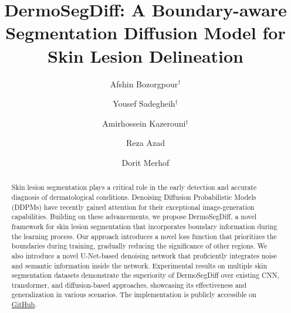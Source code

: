 \documentclass[runningheads]{llncs}
\begin{document}
\title{DermoSegDiff: A Boundary-aware Segmentation Diffusion Model for Skin Lesion Delineation}


\author{Afshin Bozorgpour$^\dag$ \and
Yousef Sadegheih$^\dag$ \and
Amirhossein Kazerouni$^\dag$ \and
Reza Azad  \and
Dorit Merhof }



\maketitle              \begin{abstract}

Skin lesion segmentation plays a critical role in the early detection and accurate diagnosis of dermatological conditions. Denoising Diffusion Probabilistic Models (DDPMs) have recently gained attention for their exceptional image-generation capabilities. Building on these advancements, we propose DermoSegDiff, a novel framework for skin lesion segmentation that incorporates boundary information during the learning process. Our approach introduces a novel loss function that prioritizes the boundaries during training, gradually reducing the significance of other regions. We also introduce a novel U-Net-based denoising network that proficiently integrates noise and semantic information inside the network. Experimental results on multiple skin segmentation datasets demonstrate the superiority of DermoSegDiff over existing CNN, transformer, and diffusion-based approaches, showcasing its effectiveness and generalization in various scenarios. The implementation is publicly accessible on \href{https://github.com/mindflow-institue/dermosegdiff}{GitHub}.

\end{abstract}
\end{document}
